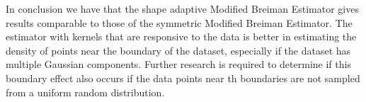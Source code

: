 
In conclusion we have that the shape adaptive Modified Breiman Estimator gives results comparable to those of the symmetric Modified Breiman Estimator. The estimator with kernels that are responsive to the data is better in estimating the density of points near the boundary of the dataset, especially if the dataset has multiple Gaussian components. Further research is required to determine if this boundary effect also occurs if the data points near th boundaries are not sampled from a uniform random distribution. 

